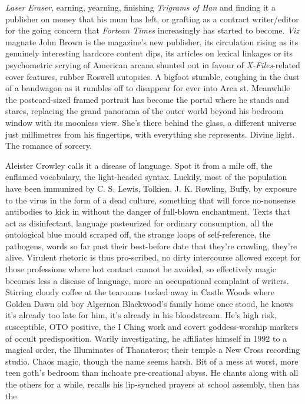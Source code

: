 \documentclass[
]{article}
\begin{document}
\emph{Laser Eraser}, earning, yearning, finishing \emph{Trigrams of Han}
and finding it a publisher on money that his mum has left, or grafting
as a contract writer/editor for the going concern that \emph{Fortean
Times} increasingly has started to become. \emph{Viz} magnate John Brown
is the magazine's new publisher, its circulation rising as its genuinely
interesting hardcore content dips, its articles on lexical linkages or
its psychometric scrying of American arcana shunted out in favour of
\emph{X-Files}-related cover features, rubber Roswell autopsies. A
bigfoot stumble, coughing in the dust of a bandwagon as it rumbles off
to disappear for ever into Area st. Meanwhile the postcard-sized framed
portrait has become the portal where he stands and stares, replacing the
grand panorama of the outer world beyond his bedroom window with its
moonless view. She's there behind the glass, a different universe just
millimetres from his fingertips, with everything she represents. Divine
light. The romance of sorcery. \par
Aleister Crowley calls it a disease of language. Spot it from a
mile off, the enflamed vocabulary, the light-headed syntax. Luckily,
most of the population have been immunized by C. S. Lewis, Tolkien, J.
K. Rowling, Buffy, by exposure to the virus in the form of a dead
culture, something that will force no-nonsense antibodies to kick in
without the danger of full-blown enchantment. Texts that act as
disinfectant, language pasteurized for ordinary consumption, all the
ontological blue mould scraped off, the strange loops of self-reference,
the pathogens, words so far past their best-before date that they're
crawling, they're alive. Virulent rhetoric is thus pro-scribed, no dirty
intercourse allowed except for those professions where hot contact
cannot be avoided, so effectively magic becomes less a disease of
language, more an occupational complaint of writers. Stirring cloudy
coffee at the tearooms tucked away in Castle Woods where Golden Dawn old
boy Algernon Blackwood's family home once stood, he knows it's already
too late for him, it's already in his bloodstream. He's high risk,
susceptible, OTO positive, the I Ching work and covert goddess-worship
markers of occult predisposition. Warily investigating, he affiliates
himself in 1992 to a magical order, the Illuminates of Thanateros; their
temple a New Cross recording studio. Chaos magic, though the name seems
harsh. Bit of a mess at worst, more teen goth's bedroom than inchoate
pre-creational abyss. He chants along with all the others for a while,
recalls his lip-synched prayers at school assembly, then has the
\end{document}
